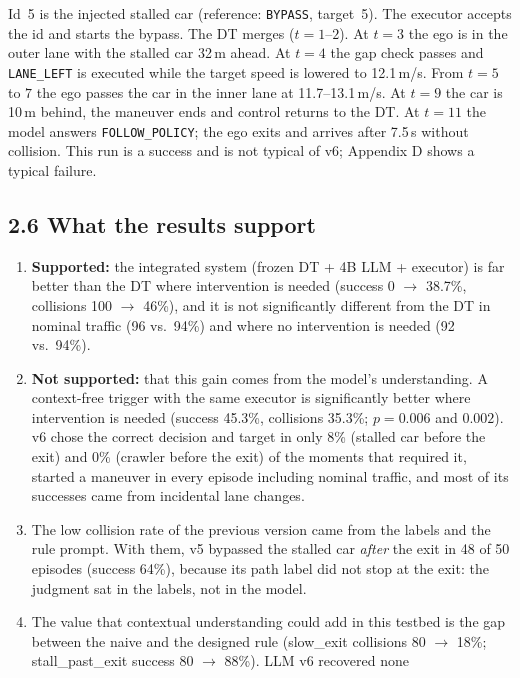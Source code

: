 \documentclass[11pt]{article}
\newenvironment{revblock}{\color{red}}{}
\begin{document}
\begin{revblock}
\noindent Id~5 is the injected stalled car (reference: \texttt{BYPASS}, target~5). The executor accepts the id and
starts the bypass. The DT merges ($t=1$--$2$). At $t=3$ the ego is in the outer lane with the stalled car 32\,m ahead.
At $t=4$ the gap check passes and \texttt{LANE\_LEFT} is executed while the target speed is lowered to 12.1\,m/s. From
$t=5$ to $7$ the ego passes the car in the inner lane at 11.7--13.1\,m/s. At $t=9$ the car is 10\,m behind, the maneuver
ends and control returns to the DT. At $t=11$ the model answers \texttt{FOLLOW\_POLICY}; the ego exits and arrives
after 7.5\,s without collision. This run is a success and is not typical of v6; Appendix D shows a
typical failure.

\subsection*{2.6 What the results support}
\begin{enumerate}[nosep]
\item \textbf{Supported:} the integrated system (frozen DT + 4B LLM + executor) is far better than the DT where
  intervention is needed (success 0 $\rightarrow$ 38.7\%, collisions 100 $\rightarrow$ 46\%), and it is not
  significantly different from the DT in nominal traffic (96 vs.\ 94\%) and where no intervention is needed (92 vs.\ 94\%).
\item \textbf{Not supported:} that this gain comes from the model's understanding. A context-free trigger with the
  same executor is significantly better where intervention is needed (success 45.3\%, collisions 35.3\%; $p=0.006$ and
  $0.002$). v6 chose the correct decision and target in only 8\% (stalled car before the exit) and 0\% (crawler before
  the exit) of the moments that required it, started a maneuver in every episode including nominal traffic, and most
  of its successes came from incidental lane changes.
\item The low collision rate of the previous version came from the labels and the rule prompt. With them, v5 bypassed
  the stalled car \emph{after} the exit in 48 of 50 episodes (success 64\%), because its path label did not stop at the
  exit: the judgment sat in the labels, not in the model.
\item The value that contextual understanding could add in this testbed is the gap between the naive and the designed
  rule (slow\_exit collisions 80 $\rightarrow$ 18\%; stall\_past\_exit success 80 $\rightarrow$ 88\%). LLM v6 recovered none

\end{enumerate}
\end{revblock}
\end{document}
